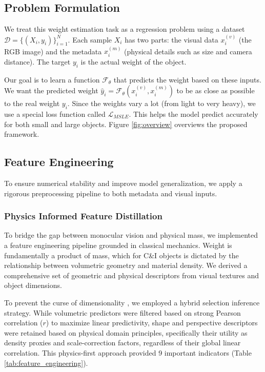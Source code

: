 \documentclass[journal,twoside,web]{ieeecolor}
\begin{document}
\subsection{Problem Formulation}
We treat this weight estimation task as a regression problem using a dataset $\mathcal{D} = \{(X_i, y_i)\}_{i=1}^N$. Each sample $X_i$ has two parts: the visual data $x^{(v)}_i$ (the RGB image) and the metadata $x^{(m)}_i$ (physical details such as size and camera distance). The target $y_i$ is the actual weight of the object.

Our goal is to learn a function $\mathcal{F}_\theta$ that predicts the weight based on these inputs. We want the predicted weight $\hat{y}_i = \mathcal{F}_\theta(x^{(v)}_i, x^{(m)}_i)$ to be as close as possible to the real weight $y_i$. Since the weights vary a lot (from light to very heavy), we use a special loss function called $\mathcal{L}_{MSLE}$. This helps the model predict accurately for both small and large objects. Figure \ref{fig:overview} overviews the proposed framework.


\subsection{Feature Engineering}
\label{subsec:preprocessing}

To ensure numerical stability and improve model generalization, we apply a rigorous preprocessing pipeline to both metadata and visual inputs. 

\subsubsection{Physics Informed Feature Distillation}
To bridge the gap between monocular vision and physical mass, we implemented a feature engineering pipeline grounded in classical mechanics. Weight is fundamentally a product of mass, which for C\&I objects is dictated by the relationship between volumetric geometry and material density. We derived a comprehensive set of geometric and physical descriptors from visual textures and object dimensions.

To prevent the curse of dimensionality \cite{jiang2023augmented, wei2021unsupervised}, we employed a hybrid selection inference strategy. While volumetric predictors were filtered based on strong Pearson correlation ($r$) to maximize linear predictivity, shape and perspective descriptors were retained based on physical domain principles, specifically their utility as density proxies and scale-correction factors, regardless of their global linear correlation. This physics-first approach provided 9 important indicators (Table \ref{tab:feature_engineering}).
\end{document}
